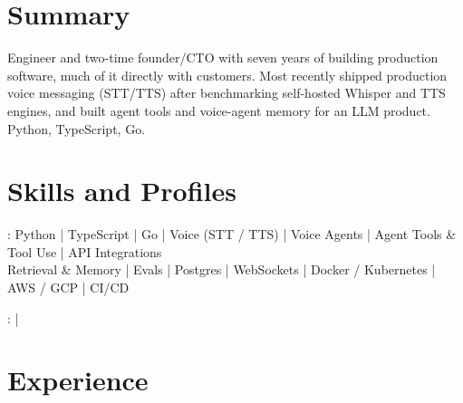 \documentclass[print]{jack-resume}
\begin{document}
\pagecolor{darkmodeBackground}


\begin{minipage}[t][1cm][t]{.03\textwidth}
    \hfill
\end{minipage}

\section{Summary}
Engineer and two-time founder/CTO with seven years of building production software, much of it directly with customers. Most recently shipped production voice messaging (STT/TTS) after benchmarking self-hosted Whisper and TTS engines, and built agent tools and voice-agent memory for an LLM product. Python, TypeScript, Go.
\sectionsep

\section{Skills and Profiles}
:
Python \hfill | \hfill
TypeScript \hfill | \hfill
Go \hfill | \hfill
Voice (STT / TTS) \hfill | \hfill
Voice Agents \hfill | \hfill
Agent Tools \& Tool Use \hfill | \hfill
API Integrations \\
\hspace{1.0cm} Retrieval \& Memory \hfill | \hfill
Evals \hfill | \hfill
Postgres \hfill | \hfill
WebSockets \hfill | \hfill
Docker / Kubernetes \hfill | \hfill
AWS / GCP \hfill | \hfill
CI/CD \\

\raggedright{
    :
      \href{https://www.linkedin.com/in/jack-sturtevant/}{ \ExternalLink} |
     \href{https://github.com/jacksturt}{ \ExternalLink}}

\section{Experience}
\end{document}
